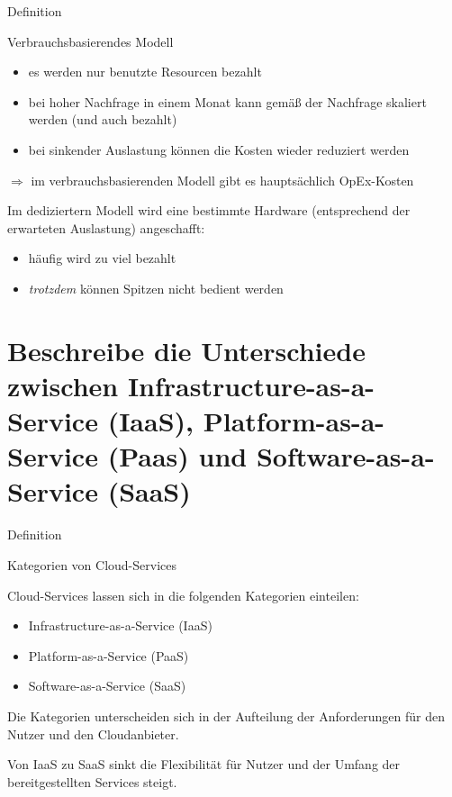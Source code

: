 \documentclass{scrartcl}
\newenvironment{flashcard}[2][]{%
    #1
    \vfill
    \centerline{\Large{#2}}
    \vfill
    \newpage
}
{\newpage}
\newcommand{\sectioncard}[1]{
    \vspace*{\stretch{1}}
    \section{#1}
    \vspace*{\stretch{1}}
    \pagebreak
}
\begin{document}
    \begin{flashcard}[Definition]{Verbrauchsbasierendes Modell}
            \begin{itemize}
                \item es werden nur benutzte Resourcen bezahlt
                \item bei hoher Nachfrage in einem Monat kann gemäß der Nachfrage skaliert werden (und auch bezahlt)
                \item bei sinkender Auslastung können die Kosten wieder reduziert werden
            \end{itemize}
            $\Rightarrow$ im verbrauchsbasierenden Modell gibt es hauptsächlich OpEx-Kosten

            \vspace{5mm}
            Im dediziertern Modell wird eine bestimmte Hardware (entsprechend der erwarteten Auslastung) angeschafft:
            \begin{itemize}
                \item häufig wird zu viel bezahlt
                \item \emph{trotzdem} können Spitzen nicht bedient werden
            \end{itemize}
    \end{flashcard}

    \sectioncard{Beschreibe die Unterschiede zwischen Infrastructure-as-a-Service (IaaS), Platform-as-a-Service (Paas) und Software-as-a-Service (SaaS)}

    \begin{flashcard}[Definition]{Kategorien von Cloud-Services}
        Cloud-Services lassen sich in die folgenden Kategorien einteilen:
        \begin{itemize}
            \item Infrastructure-as-a-Service (IaaS)
            \item Platform-as-a-Service (PaaS)
            \item Software-as-a-Service (SaaS)
        \end{itemize}
        Die Kategorien unterscheiden sich in der Aufteilung der Anforderungen für den Nutzer und den Cloudanbieter.

        Von IaaS zu SaaS sinkt die Flexibilität für Nutzer und der Umfang der bereitgestellten Services steigt.

    \end{flashcard}
\end{document}
